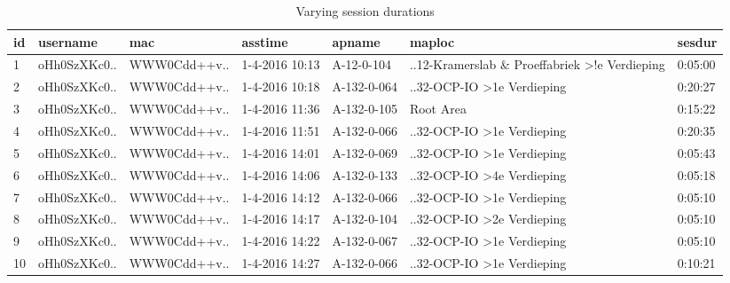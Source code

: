 \begin{table}[H]
	\centering
	\captionsetup{justification=centering}
	\caption{Varying session durations}
	\label{sesdur_example}
	\begin{tabular}{@{}lllllll@{}}
		\toprule
		\textbf{id} & \textbf{username} & \textbf{mac} & \textbf{asstime} & \textbf{apname} & \textbf{maploc}                                                                     & \textbf{sesdur} \\ \midrule
		1           & oHh0SzXKc0..      & WWW0Cdd++v.. & 1-4-2016 10:13   & A-12-0-104      & ..12-Kramerslab \& Proeffabriek \textgreater !e Verdieping & 0:05:00         \\
		2           & oHh0SzXKc0..      & WWW0Cdd++v.. & 1-4-2016 10:18   & A-132-0-064     & ..32-OCP-IO \textgreater 1e Verdieping                     & 0:20:27         \\
		3           & oHh0SzXKc0..      & WWW0Cdd++v.. & 1-4-2016 11:36   & A-132-0-105     & Root Area                                                                           & 0:15:22         \\
		4           & oHh0SzXKc0..      & WWW0Cdd++v.. & 1-4-2016 11:51   & A-132-0-066     & ..32-OCP-IO \textgreater 1e Verdieping                     & 0:20:35         \\
		5           & oHh0SzXKc0..      & WWW0Cdd++v.. & 1-4-2016 14:01   & A-132-0-069     & ..32-OCP-IO \textgreater 1e Verdieping                     & 0:05:43         \\
		6           & oHh0SzXKc0..      & WWW0Cdd++v.. & 1-4-2016 14:06   & A-132-0-133     & ..32-OCP-IO \textgreater 4e Verdieping                     & 0:05:18         \\
		7           & oHh0SzXKc0..      & WWW0Cdd++v.. & 1-4-2016 14:12   & A-132-0-066     & ..32-OCP-IO \textgreater 1e Verdieping                     & 0:05:10         \\
		8           & oHh0SzXKc0..      & WWW0Cdd++v.. & 1-4-2016 14:17   & A-132-0-104     & ..32-OCP-IO \textgreater 2e Verdieping                     & 0:05:10         \\
		9           & oHh0SzXKc0..      & WWW0Cdd++v.. & 1-4-2016 14:22   & A-132-0-067     & ..32-OCP-IO \textgreater 1e Verdieping                     & 0:05:10         \\
		10          & oHh0SzXKc0..      & WWW0Cdd++v.. & 1-4-2016 14:27   & A-132-0-066     & ..32-OCP-IO \textgreater 1e Verdieping                     & 0:10:21         \\ \bottomrule
	\end{tabular}
\end{table}
